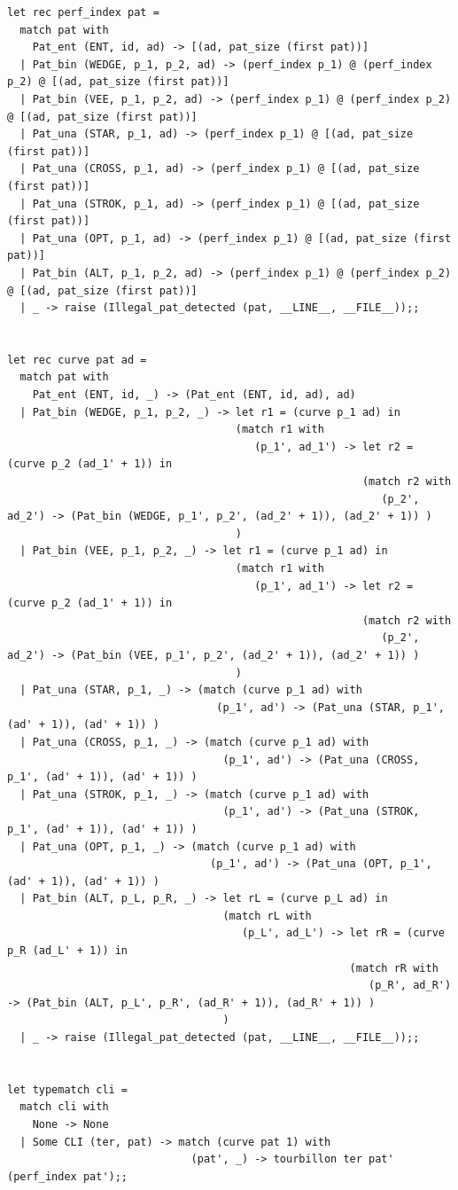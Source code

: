 \documentclass[12pt]{article}
\begin{document}
\begin{tiny}
\begin{verbatim}
let rec perf_index pat =
  match pat with
    Pat_ent (ENT, id, ad) -> [(ad, pat_size (first pat))]
  | Pat_bin (WEDGE, p_1, p_2, ad) -> (perf_index p_1) @ (perf_index p_2) @ [(ad, pat_size (first pat))]
  | Pat_bin (VEE, p_1, p_2, ad) -> (perf_index p_1) @ (perf_index p_2) @ [(ad, pat_size (first pat))]
  | Pat_una (STAR, p_1, ad) -> (perf_index p_1) @ [(ad, pat_size (first pat))]
  | Pat_una (CROSS, p_1, ad) -> (perf_index p_1) @ [(ad, pat_size (first pat))]
  | Pat_una (STROK, p_1, ad) -> (perf_index p_1) @ [(ad, pat_size (first pat))]
  | Pat_una (OPT, p_1, ad) -> (perf_index p_1) @ [(ad, pat_size (first pat))]
  | Pat_bin (ALT, p_1, p_2, ad) -> (perf_index p_1) @ (perf_index p_2) @ [(ad, pat_size (first pat))]
  | _ -> raise (Illegal_pat_detected (pat, __LINE__, __FILE__));;


let rec curve pat ad =
  match pat with
    Pat_ent (ENT, id, _) -> (Pat_ent (ENT, id, ad), ad)
  | Pat_bin (WEDGE, p_1, p_2, _) -> let r1 = (curve p_1 ad) in
                                    (match r1 with
                                       (p_1', ad_1') -> let r2 = (curve p_2 (ad_1' + 1)) in
                                                        (match r2 with
                                                           (p_2', ad_2') -> (Pat_bin (WEDGE, p_1', p_2', (ad_2' + 1)), (ad_2' + 1)) )
                                    )
  | Pat_bin (VEE, p_1, p_2, _) -> let r1 = (curve p_1 ad) in
                                    (match r1 with
                                       (p_1', ad_1') -> let r2 = (curve p_2 (ad_1' + 1)) in
                                                        (match r2 with
                                                           (p_2', ad_2') -> (Pat_bin (VEE, p_1', p_2', (ad_2' + 1)), (ad_2' + 1)) )
                                    )
  | Pat_una (STAR, p_1, _) -> (match (curve p_1 ad) with
                                 (p_1', ad') -> (Pat_una (STAR, p_1', (ad' + 1)), (ad' + 1)) )
  | Pat_una (CROSS, p_1, _) -> (match (curve p_1 ad) with
                                  (p_1', ad') -> (Pat_una (CROSS, p_1', (ad' + 1)), (ad' + 1)) )
  | Pat_una (STROK, p_1, _) -> (match (curve p_1 ad) with
                                  (p_1', ad') -> (Pat_una (STROK, p_1', (ad' + 1)), (ad' + 1)) )
  | Pat_una (OPT, p_1, _) -> (match (curve p_1 ad) with
                                (p_1', ad') -> (Pat_una (OPT, p_1', (ad' + 1)), (ad' + 1)) )
  | Pat_bin (ALT, p_L, p_R, _) -> let rL = (curve p_L ad) in
                                  (match rL with
                                     (p_L', ad_L') -> let rR = (curve p_R (ad_L' + 1)) in
                                                      (match rR with
                                                         (p_R', ad_R') -> (Pat_bin (ALT, p_L', p_R', (ad_R' + 1)), (ad_R' + 1)) )
                                  )
  | _ -> raise (Illegal_pat_detected (pat, __LINE__, __FILE__));;


let typematch cli =
  match cli with
    None -> None
  | Some CLI (ter, pat) -> match (curve pat 1) with
                             (pat', _) -> tourbillon ter pat' (perf_index pat');;
\end{verbatim}
\end{tiny}
\end{document}
